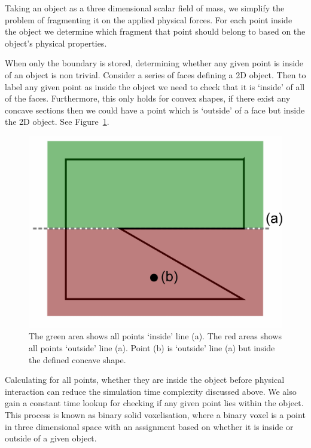 \label{sect:sol}

Taking an object as a three dimensional scalar field of mass, we simplify the problem of fragmenting it on the applied physical forces. For each point inside the object we determine which fragment that point should belong to based on the object's physical properties.

When only the boundary is stored, determining whether any given point is inside of an object is non trivial. Consider a series of faces defining a 2D object. Then to label any given point as inside the object we need to check that it is `inside' of all of the faces\cite{Ray-tracing}. Furthermore, this only holds for convex shapes, if there exist any concave sections then we could have a point which is `outside' of a face but inside the 2D object. See Figure~\ref{fig:1.1}.

\begin{figure}[b!]
\centerline{\includegraphics[scale=0.4]{point_inside_concave13.pdf}}
\caption{The green area shows all points `inside' line (a). The red areas shows all points `outside' line (a). Point (b) is `outside' line (a) but inside the defined concave shape.}
\label{fig:1.1}
\end{figure}

Calculating for all points, whether they are inside the object before physical interaction can reduce the simulation time complexity discussed above. We also gain a constant time lookup for checking if any given point lies within the object. This process is known as binary solid voxelisation, where a binary voxel is a point in three dimensional space with an assignment based on whether it is inside or outside of a given object\cite{Schwarz:2010:Vox}.

